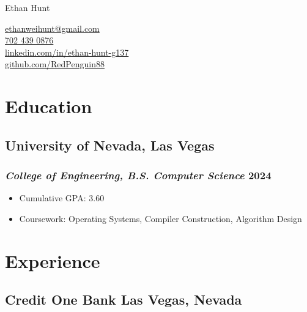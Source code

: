 \documentclass[11pt,letterpaper]{article}
\begin{document}
\begin{center}
    \begin{minipage}{0.5\textwidth}
        {\fontsize{36}{36}\selectfont\intermedium Ethan Hunt} \\
    \end{minipage} \hfill
    \begin{minipage}{0.41\textwidth}
        {\color{icnclr}\faEnvelope[regular]} \href{mailto:ethanweihunt@gmail.com}{ethanweihunt@gmail.com} \\
        {\color{icnclr}\hspace{1.9pt}} \hspace{2.5pt}\href{tel:7024390876}{702 439 0876} \\
        {\color{icnclr}\hspace{0.8pt}\faLinkedinIn} \hspace{0.8pt}\href{https://www.linkedin.com/in/ethan-hunt-g137}{linkedin.com/in/ethan-hunt-g137} \\
        {\color{icnclr}\faGithub} \href{https://www.github.com/RedPenguin88}{github.com/RedPenguin88}
    \end{minipage}
\end{center}

\section{Education}
\subsection{University of Nevada, Las Vegas}
\subsubsection{\normalfont\textit{College of Engineering, B.S. Computer Science} \hfill 2024}
\begin{itemize}
    \item Cumulative GPA: 3.60
    \item Coursework: Operating Systems, Compiler Construction, Algorithm Design
\end{itemize}

\section{Experience}
\subsection{Credit One Bank \hfill Las Vegas, Nevada}
\end{document}
